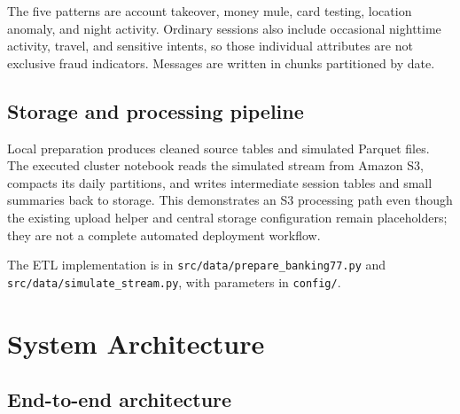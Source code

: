\documentclass[
  english,
  11pt,
  letterpaper,
]{article}
\begin{document}
The five patterns are account takeover, money mule, card testing,
location anomaly, and night activity. Ordinary sessions also include
occasional nighttime activity, travel, and sensitive intents, so those
individual attributes are not exclusive fraud indicators. Messages are
written in chunks partitioned by date.

\subsection{Storage and processing
pipeline}\label{storage-and-processing-pipeline}

Local preparation produces cleaned source tables and simulated Parquet
files. The executed cluster notebook reads the simulated stream from
Amazon S3, compacts its daily partitions, and writes intermediate
session tables and small summaries back to storage. This demonstrates an
S3 processing path even though the existing upload helper and central
storage configuration remain placeholders; they are not a complete
automated deployment workflow.

The ETL implementation is in \texttt{src/data/prepare\_banking77.py} and
\texttt{src/data/simulate\_stream.py}, with parameters in
\texttt{config/}.

\section{System Architecture}\label{sec-architecture}

\subsection{End-to-end architecture}\label{end-to-end-architecture}
\end{document}
